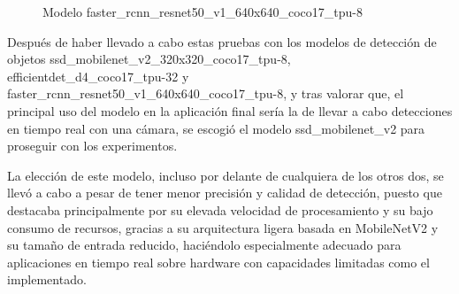   	\begin{figure}[H]
    		\begin{center}
      		\subcapcentertrue
      		\hspace{2mm}
    	\end{center}
    	\caption{Modelo faster\_rcnn\_resnet50\_v1\_640x640\_coco17\_tpu-8 }
    	\label{fig:modelo_faster_rcnn_resnet50}
  	\end{figure}	

Después de haber llevado a cabo estas pruebas con los modelos de detección de objetos ssd\_mobilenet\_v2\_320x320\_coco17\_tpu-8, efficientdet\_d4\_coco17\_tpu-32 y faster\_rcnn\_resnet50\_v1\_640x640\_coco17\_tpu-8, y tras valorar que, el principal uso del modelo en la aplicación final sería la de llevar a cabo detecciones en tiempo real con una cámara, se escogió el modelo ssd\_mobilenet\_v2 para proseguir con los experimentos. 

La elección de este modelo, incluso por delante de cualquiera de los otros dos, se llevó a cabo a pesar de tener menor precisión y calidad de detección, puesto que destacaba principalmente por su elevada velocidad de procesamiento y su bajo consumo de recursos, gracias a su arquitectura ligera basada en MobileNetV2 y su tamaño de entrada reducido, haciéndolo especialmente adecuado para aplicaciones en tiempo real sobre hardware con capacidades limitadas como el implementado.

